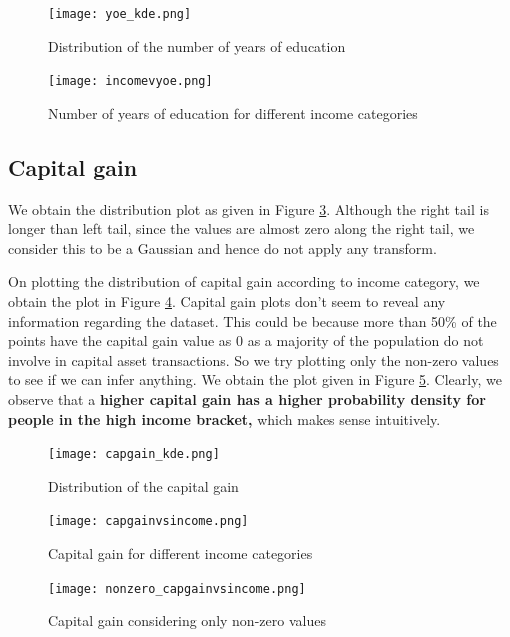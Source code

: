\documentclass[conference]{IEEEtran}
\begin{document}
\begin{figure}[tbh]
\centering
\texttt{[image: yoe\_kde.png]}
\caption{Distribution of the number of years of education}
\label{yoe_kde}
\end{figure}

\begin{figure}[tbh]
\centering
\texttt{[image: incomevyoe.png]}
\caption{Number of years of education for different income categories}
\label{incomevyoe}
\end{figure}

\subsection*{Capital gain}

We obtain the distribution plot as given in Figure \ref{capgain_kde}. Although the right tail is longer than left tail, since the values are almost zero along the right tail, we consider this to be a Gaussian and hence do not apply any transform.

On plotting the distribution of capital gain according to income category, we obtain the plot in Figure \ref{capgainvsincome}. Capital gain plots don't seem to reveal any information regarding the dataset. This could be because more than 50\% of the points have the capital gain value as 0 as a majority of the population do not involve in capital asset transactions. So we try plotting only the non-zero values to see if we can infer anything. We obtain the plot given in Figure \ref{nonzero_capgainvsincome}. Clearly, we observe that a \textbf{higher capital gain has a higher probability density for people in the high income bracket,} which makes sense intuitively. 


\begin{figure}[tbh]
\centering
\texttt{[image: capgain\_kde.png]}
\caption{Distribution of the capital gain}
\label{capgain_kde}
\end{figure}

\begin{figure}[tbh]
\centering
\texttt{[image: capgainvsincome.png]}
\caption{Capital gain for different income categories}
\label{capgainvsincome}
\end{figure}

\begin{figure}[tbh]
\centering
\texttt{[image: nonzero\_capgainvsincome.png]}
\caption{Capital gain considering only non-zero values}
\label{nonzero_capgainvsincome}
\end{figure}
\end{document}
